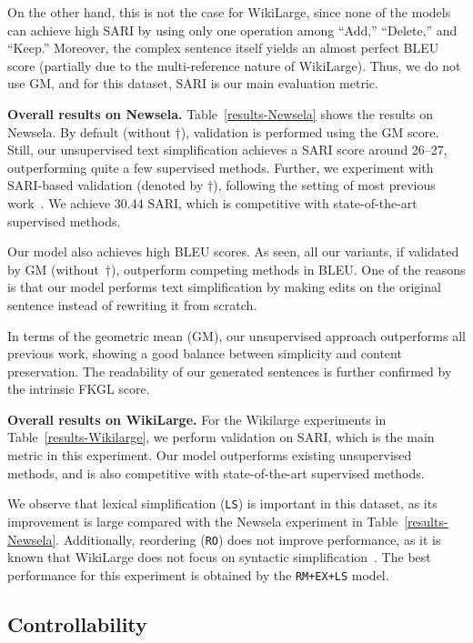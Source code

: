 \documentclass[11pt,a4paper]{article}
\begin{document}
On the other hand, this is not the case for WikiLarge, since none of the models can achieve high SARI by using only one operation among ``Add,'' ``Delete,'' and ``Keep.''
Moreover, the complex sentence itself yields an almost perfect BLEU score (partially due to the multi-reference nature of WikiLarge). Thus, we do not use GM, and for this dataset, SARI is our main evaluation metric. 


\textbf{Overall results on Newsela.}
 Table~\ref{results-Newsela} shows the results on Newsela. By default (without $\dag$), validation is performed using the GM score. Still, our unsupervised text simplification achieves a SARI score around 26--27, outperforming quite a few supervised methods. Further, we experiment with SARI-based validation (denoted by $\dag$), following the setting of most previous work~\cite{dong2019editnts,guo2018dynamic}. We achieve 30.44 SARI, which is competitive with state-of-the-art supervised methods.


Our model also achieves high BLEU scores. As seen, all our variants, if validated by GM (without~$\dag$), outperform competing methods in BLEU. One of the reasons is that our model performs text simplification by making edits on the original sentence instead of rewriting it from scratch.

In terms of the geometric mean (GM), our unsupervised approach outperforms all previous work, showing a good balance between simplicity and content preservation. The readability of our generated sentences is further confirmed by the intrinsic FKGL score.

\textbf{Overall results on WikiLarge.}
For the Wikilarge experiments in Table~\ref{results-Wikilarge}, we perform validation on SARI, which is the main metric in this experiment. Our model outperforms existing unsupervised methods, and is also competitive with  state-of-the-art supervised methods. 

We observe that lexical simplification ({\tt LS}) is important in this dataset, as its improvement is large compared with the Newsela experiment in Table~\ref{results-Newsela}.
 Additionally, reordering ({\tt RO}) does not improve performance, as it is known that WikiLarge does not focus on syntactic simplification~\cite{xu-etal-2016-optimizing}.
The best performance for this experiment is obtained by the {\tt RM+EX+LS} model.





\subsection{Controllability}
\label{adaptability}
\end{document}
